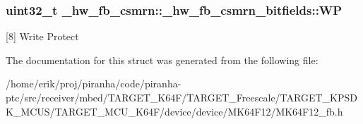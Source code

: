 \subsubsection[{\texorpdfstring{WP}{WP}}]{\setlength{\rightskip}{0pt plus 5cm}uint32\+\_\+t \+\_\+hw\+\_\+fb\+\_\+csmrn\+::\+\_\+hw\+\_\+fb\+\_\+csmrn\+\_\+bitfields\+::\+WP}\hypertarget{struct__hw__fb__csmrn_1_1__hw__fb__csmrn__bitfields_ac88d3718c7a5e3b0ccfc223c895c6fea}{}\label{struct__hw__fb__csmrn_1_1__hw__fb__csmrn__bitfields_ac88d3718c7a5e3b0ccfc223c895c6fea}
\mbox{[}8\mbox{]} Write Protect 

The documentation for this struct was generated from the following file\+:\begin{DoxyCompactItemize}
\item 
/home/erik/proj/piranha/code/piranha-\/ptc/src/receiver/mbed/\+T\+A\+R\+G\+E\+T\+\_\+\+K64\+F/\+T\+A\+R\+G\+E\+T\+\_\+\+Freescale/\+T\+A\+R\+G\+E\+T\+\_\+\+K\+P\+S\+D\+K\+\_\+\+M\+C\+U\+S/\+T\+A\+R\+G\+E\+T\+\_\+\+M\+C\+U\+\_\+\+K64\+F/device/device/\+M\+K64\+F12/M\+K64\+F12\+\_\+fb.\+h\end{DoxyCompactItemize}

